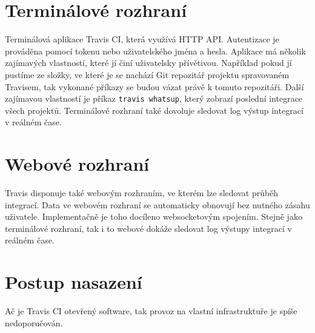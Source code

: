 \section{Terminálové rozhraní}

Terminálová aplikace Travis CI, která využívá HTTP API.
Autentizace je prováděna pomocí tokenu nebo uživatelského jména a hesla.
Aplikace má několik zajímavých vlastností, které jí činí uživatelsky přívětivou.
Například pokud jí pustíme ze složky, ve které je se nachází Git repozitář projektu spravovaném Travisem, tak vykonané příkazy se budou vázat právě k tomuto repozitáři.
Další zajímavou vlastností je příkaz \verb|travis whatsup|, který zobrazí poslední integrace všech projektů.
Terminálové rozhraní také dovoluje sledovat log výstup integrací v reálném čase. 

\section{Webové rozhraní}

Travis disponuje také webovým rozhraním, ve kterém lze sledovat průběh integrací.
Data ve webovém rozhraní se automaticky obnovují bez nutného zásahu uživatele.
Implementačně je toho docíleno websocketovým spojením.
Stejně jako terminálové rozhraní, tak i to webové dokáže sledovat log výstupy integrací v reálném čase.

\section{Postup nasazení}

Ač je Travis CI otevřený software, tak provoz na vlastní infrastruktuře je spíše nedoporučován.
